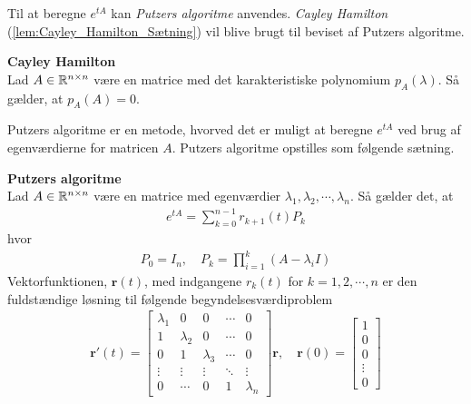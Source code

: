 Til at beregne $e^{tA}$ kan \textit{Putzers algoritme} anvendes.  
\textit{Cayley Hamilton} (\autoref{lem:Cayley_Hamilton_Sætning}) vil blive brugt til beviset af Putzers algoritme. 
\begin{lem}\textbf{Cayley Hamilton}\label{lem:Cayley_Hamilton_Sætning}\\
Lad $A \in \mathbb{R}^{n\times n}$ være en matrice med det karakteristiske polynomium $p_A(\lambda)$. Så gælder, at $p_A(A) = 0$.
\end{lem}

Putzers algoritme er en metode, hvorved det er muligt at beregne $e^{tA}$ ved brug af egenværdierne for matricen $A$. Putzers algoritme opstilles som følgende sætning.

\begin{thmx}\textbf{Putzers algoritme}\label{sæt:putzers_algoritme}\\
Lad $A \in \mathbb{R}^{n \times n}$ være en matrice med egenværdier $\lambda_1, \lambda_2, \cdots, \lambda_n$. Så gælder det, at
%
\begin{align}\label{eq:Putzer_algoritme}
    e^{tA} = \sum_{k=0}^{n-1}r_{k+1}(t)P_k
\end{align}
%
hvor
\begin{align}\label{eq:putzers_algoritme_P}
    P_0 = I_n, \quad P_k = \prod_{i=1}^k (A-\lambda_i I)
\end{align}
Vektorfunktionen, $\textbf{r}(t)$,  med indgangene $r_k(t)$ for $k=1, 2, \cdots, n$ er den fuldstændige løsning til følgende begyndelsesværdiproblem
%
\begin{align} \label{eq:putzers_algoritme_r(t)_begyndelsesværdiproblem}
    \textbf{r}'(t) = 
    \begin{bmatrix} 
        \lambda_1   &   0   & 0 & \cdots & 0\\
        1   & \lambda_2 & 0 & \cdots & 0\\
        0 & 1 & \lambda_3 & \cdots & 0\\
        \vdots & \vdots & \vdots & \ddots & \vdots\\
        0 & \cdots & 0 & 1 & \lambda_n
    \end{bmatrix}  \textbf{r} , \quad  \textbf{r}(0) = \begin{bmatrix} 1 \\ 0\\ 0\\ \vdots\\ 0 \end{bmatrix}
\end{align} 
\end{thmx}

